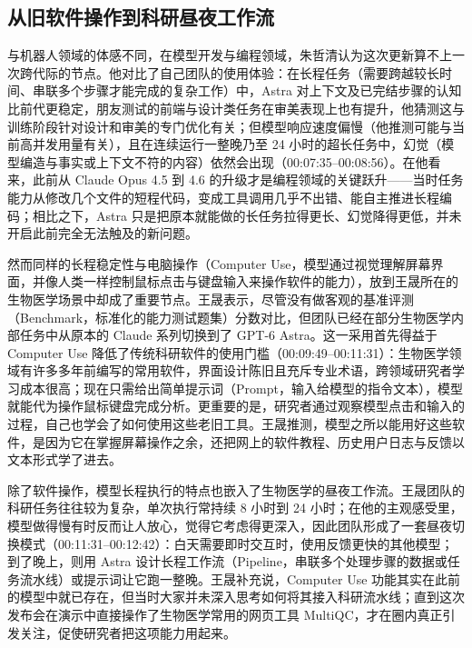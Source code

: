 \documentclass[UTF8,a4paper,11pt,fontset=fandol]{ctexart}
\begin{document}
\subsection{从旧软件操作到科研昼夜工作流}
与机器人领域的体感不同，在模型开发与编程领域，朱哲清认为这次更新算不上一次跨代际的节点。他对比了自己团队的使用体验：在长程任务（需要跨越较长时间、串联多个步骤才能完成的复杂工作）中，Astra 对上下文及已完结步骤的认知比前代更稳定，朋友测试的前端与设计类任务在审美表现上也有提升，他猜测这与训练阶段针对设计和审美的专门优化有关；但模型响应速度偏慢（他推测可能与当前高并发用量有关），且在连续运行一整晚乃至 24 小时的超长任务中，幻觉（模型编造与事实或上下文不符的内容）依然会出现（00:07:35–00:08:56）。在他看来，此前从 Claude Opus 4.5 到 4.6 的升级才是编程领域的关键跃升——当时任务能力从修改几个文件的短程代码，变成工具调用几乎不出错、能自主推进长程编码；相比之下，Astra 只是把原本就能做的长任务拉得更长、幻觉降得更低，并未开启此前完全无法触及的新问题。

然而同样的长程稳定性与电脑操作（Computer Use，模型通过视觉理解屏幕界面，并像人类一样控制鼠标点击与键盘输入来操作软件的能力），放到王晟所在的生物医学场景中却成了重要节点。王晟表示，尽管没有做客观的基准评测（Benchmark，标准化的能力测试题集）分数对比，但团队已经在部分生物医学内部任务中从原本的 Claude 系列切换到了 GPT-6 Astra。这一采用首先得益于 Computer Use 降低了传统科研软件的使用门槛（00:09:49–00:11:31）：生物医学领域有许多多年前编写的常用软件，界面设计陈旧且充斥专业术语，跨领域研究者学习成本很高；现在只需给出简单提示词（Prompt，输入给模型的指令文本），模型就能代为操作鼠标键盘完成分析。更重要的是，研究者通过观察模型点击和输入的过程，自己也学会了如何使用这些老旧工具。王晟推测，模型之所以能用好这些软件，是因为它在掌握屏幕操作之余，还把网上的软件教程、历史用户日志与反馈以文本形式学了进去。

除了软件操作，模型长程执行的特点也嵌入了生物医学的昼夜工作流。王晟团队的科研任务往往较为复杂，单次执行常持续 8 小时到 24 小时；在他的主观感受里，模型做得慢有时反而让人放心，觉得它考虑得更深入，因此团队形成了一套昼夜切换模式（00:11:31–00:12:42）：白天需要即时交互时，使用反馈更快的其他模型；到了晚上，则用 Astra 设计长程工作流（Pipeline，串联多个处理步骤的数据或任务流水线）或提示词让它跑一整晚。王晟补充说，Computer Use 功能其实在此前的模型中就已存在，但当时大家并未深入思考如何将其接入科研流水线；直到这次发布会在演示中直接操作了生物医学常用的网页工具 MultiQC，才在圈内真正引发关注，促使研究者把这项能力用起来。
\end{document}
